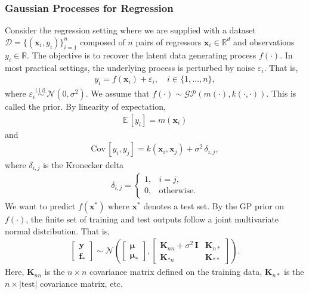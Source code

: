 \documentclass[journal=jacsat,manuscript=article]{achemso}
\newcommand{\reals}{\ensuremath{\mathbb{R}}}
\newcommand{\xvec}{\ensuremath{\mathbf{x}}}
\begin{document}
{\subsubsection{Gaussian Processes for Regression}
Consider the regression setting where we are supplied with a dataset $\mathcal{D} = \{(\xvec_i, y_i)\}_{i=1}^n$ composed of $n$ pairs of regressors $\xvec_i \in \reals^d$ and observations $y_i \in \reals$. The objective is to recover the latent data generating process $f(\cdot)$. In most practical settings, the underlying process is perturbed by noise $\varepsilon_i$. That is,
\begin{gather}
    y_i = f(\xvec_i) + \varepsilon_i, \quad i \in \{1,\dots, n\},
\end{gather}
where $\varepsilon_i \stackrel{\text{i.i.d.}}{\sim} \mathcal{N}(0,\sigma^2)$. We assume that $f(\cdot)\sim \mathcal{GP}(m(\cdot),k(\cdot,\cdot))$. This is called the prior. By linearity of expectation,
\begin{gather}
    \mathbb{E}\,[y_i] = m(\xvec_i)
\end{gather}
and
\begin{gather}
    \text{Cov}\,[y_i, y_j] = k(\xvec_i, \xvec_j) + \sigma^2 \,\delta_{i,j},
\end{gather}
where $\delta_{i,j}$ is the Kronecker delta
\begin{gather}
    \delta_{i,j} = 
    \begin{cases}
        1, & i=j,\\
        0, & \text{otherwise}.
    \end{cases}
\end{gather}
We want to predict $f(\xvec^*)$ where $\xvec^*$ denotes a test set. By the GP prior on $f(\cdot)$, the finite set of training and test outputs follow a joint multivariate normal distribution. That is,
\begin{gather}
    \begin{bmatrix}
        \mathbf{y} \\
        \mathbf{f}_*
    \end{bmatrix}
    \sim 
    \mathcal{N}\left(
    \begin{bmatrix}
        \boldsymbol{\mu}\\
        \boldsymbol{\mu}_*
    \end{bmatrix},
    \begin{bmatrix}
        \mathbf{K}_{nn} +\sigma^2\,\mathbf{I} & \mathbf{K}_{n*} \\
        \mathbf{K}_{*n} & \mathbf{K}_{**}
    \end{bmatrix} \right).
\end{gather}
Here, $\mathbf{K}_{nn}$ is the $n\times n$ covariance matrix defined on the training data,  $\mathbf{K}_{n*}$ is the $n \times |\text{test}|$ covariance matrix, etc. 

}
\end{document}
